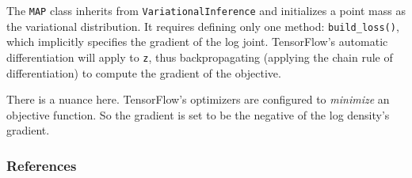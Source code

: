 The \texttt{MAP} class inherits from \texttt{VariationalInference} and
initializes a point mass as the variational distribution. It requires
defining only one method:
\texttt{build_loss()}, which implicitly specifies the gradient of the
log joint. TensorFlow's automatic differentiation will apply to
\texttt{z}, thus backpropagating (applying the chain rule of
differentiation) to compute the gradient of the objective.

There is a nuance here. TensorFlow's optimizers are configured to
\emph{minimize} an objective function. So the gradient is set to be
the negative of the log density's gradient.

\subsubsection{References}\label{references}
